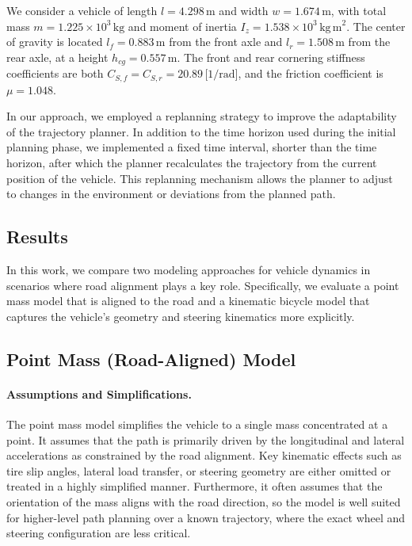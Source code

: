 We consider a vehicle of length \(l = 4.298\,\mathrm{m}\) and width \(w = 1.674\,\mathrm{m}\), with total mass \(m = 1.225\times10^3\,\mathrm{kg}\)
and moment of inertia \(I_z = 1.538\times10^3\,\mathrm{kg\,m}^2\).
The center of gravity is located \(l_f = 0.883\,\mathrm{m}\) from the front axle and \(l_r = 1.508\,\mathrm{m}\) from the rear axle, at a height
\(h_{cg} = 0.557\,\mathrm{m}\).
The front and rear cornering stiffness coefficients are both \(C_{S,f} = C_{S,r} = 20.89\,\text{[1/rad]}\), and the friction coefficient is \(\mu =
1.048\).

In our approach, we employed a replanning strategy to improve the adaptability of the trajectory planner.
In addition to the time horizon used during the initial planning phase, we implemented a fixed time interval, shorter than the time horizon, after
which the planner recalculates the trajectory from the current position of the vehicle.
This replanning mechanism allows the planner to adjust to changes in the environment or deviations from the planned path.

\subsection{Results} \label{subsec:results}

In this work, we compare two modeling approaches for vehicle dynamics in scenarios where road alignment plays a key role.
Specifically, we evaluate a point mass model that is aligned to the road and a kinematic bicycle model that captures the vehicle's geometry and
steering kinematics more explicitly.

\subsection*{Point Mass (Road-Aligned) Model}

\paragraph{Assumptions and Simplifications.}
The point mass model simplifies the vehicle to a single mass concentrated at a point.
It assumes that the path is primarily driven by the longitudinal and lateral accelerations as constrained by the road alignment.
Key kinematic effects such as tire slip angles, lateral load transfer, or steering geometry are either omitted or treated in a highly simplified
manner.
Furthermore, it often assumes that the orientation of the mass aligns with the road direction, so the model is well suited for higher-level path
planning over a known trajectory, where the exact wheel and steering configuration are less critical.

